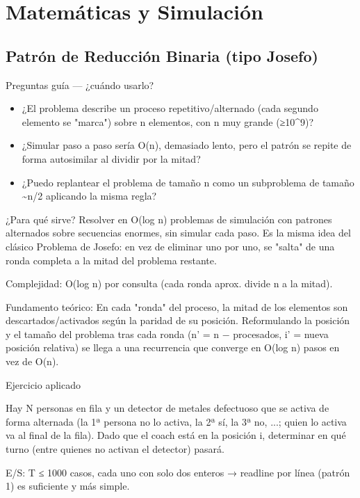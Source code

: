 \section{Matemáticas y Simulación}

\subsection{Patrón de Reducción Binaria (tipo Josefo)}

Preguntas guía — ¿cuándo usarlo?

\begin{itemize}
\item ¿El problema describe un proceso repetitivo/alternado (cada segundo elemento se "marca") sobre n elementos, con n muy grande (≥10\textasciicircum{}9)?
\item ¿Simular paso a paso sería O(n), demasiado lento, pero el patrón se repite de forma autosimilar al dividir por la mitad?
\item ¿Puedo replantear el problema de tamaño n como un subproblema de tamaño \textasciitilde{}n/2 aplicando la misma regla?
\end{itemize}

¿Para qué sirve? Resolver en O(log n) problemas de simulación con patrones alternados sobre secuencias enormes, sin simular cada paso. Es la misma idea del clásico Problema de Josefo: en vez de eliminar uno por uno, se "salta" de una ronda completa a la mitad del problema restante.

Complejidad: O(log n) por consulta (cada ronda aprox. divide n a la mitad).

Fundamento teórico: En cada "ronda" del proceso, la mitad de los elementos son descartados/activados según la paridad de su posición. Reformulando la posición y el tamaño del problema tras cada ronda (n' = n − procesados, i' = nueva posición relativa) se llega a una recurrencia que converge en O(log n) pasos en vez de O(n).

Ejercicio aplicado

Hay N personas en fila y un detector de metales defectuoso que se activa de forma alternada (la 1ª persona no lo activa, la 2ª sí, la 3ª no, ...; quien lo activa va al final de la fila). Dado que el coach está en la posición i, determinar en qué turno (entre quienes no activan el detector) pasará.

E/S: T ≤ 1000 casos, cada uno con solo dos enteros → readline por línea (patrón 1) es suficiente y más simple.

